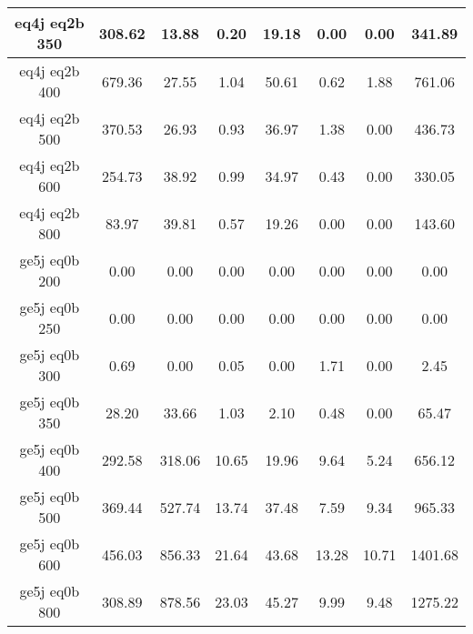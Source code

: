 \begin{longtable}{| c | c | c | c | c | c | c | c  | }
eq4j eq2b 350 & 308.62 & 13.88 & 0.20 & 19.18 & 0.00 & 0.00 & 341.89\\ \hline 
eq4j eq2b 400 & 679.36 & 27.55 & 1.04 & 50.61 & 0.62 & 1.88 & 761.06\\ \hline 
eq4j eq2b 500 & 370.53 & 26.93 & 0.93 & 36.97 & 1.38 & 0.00 & 436.73\\ \hline 
eq4j eq2b 600 & 254.73 & 38.92 & 0.99 & 34.97 & 0.43 & 0.00 & 330.05\\ \hline 
eq4j eq2b 800 & 83.97 & 39.81 & 0.57 & 19.26 & 0.00 & 0.00 & 143.60\\ \hline 
ge5j eq0b 200 & 0.00 & 0.00 & 0.00 & 0.00 & 0.00 & 0.00 & 0.00\\ \hline 
ge5j eq0b 250 & 0.00 & 0.00 & 0.00 & 0.00 & 0.00 & 0.00 & 0.00\\ \hline 
ge5j eq0b 300 & 0.69 & 0.00 & 0.05 & 0.00 & 1.71 & 0.00 & 2.45\\ \hline 
ge5j eq0b 350 & 28.20 & 33.66 & 1.03 & 2.10 & 0.48 & 0.00 & 65.47\\ \hline 
ge5j eq0b 400 & 292.58 & 318.06 & 10.65 & 19.96 & 9.64 & 5.24 & 656.12\\ \hline 
ge5j eq0b 500 & 369.44 & 527.74 & 13.74 & 37.48 & 7.59 & 9.34 & 965.33\\ \hline 
ge5j eq0b 600 & 456.03 & 856.33 & 21.64 & 43.68 & 13.28 & 10.71 & 1401.68\\ \hline 
ge5j eq0b 800 & 308.89 & 878.56 & 23.03 & 45.27 & 9.99 & 9.48 & 1275.22\\ \hline 
    \hline 
    \hline 
\end{longtable}
